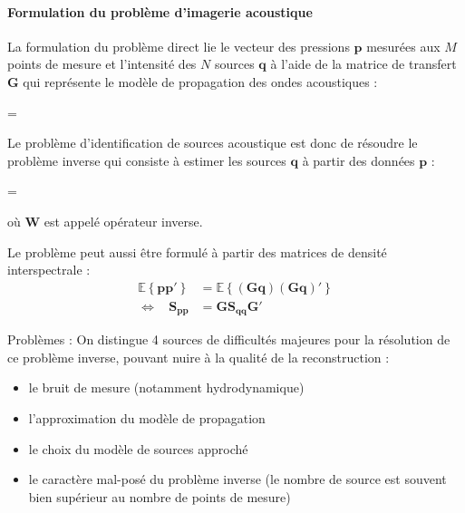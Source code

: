 \documentclass[twocolumn, 11pt, landscape]{article}
\renewenvironment{equation}{\vspace{-0.2cm}\begin{oldequation}}{\vspace{-0.2cm}\end{oldequation}}
\begin{document}
\paragraph{Formulation du problème d'imagerie acoustique}
La formulation du problème direct lie le vecteur des pressions $\bm{p}$ mesurées aux $M$ points de mesure et l'intensité des $N$ sources $\bm{q}$ à l'aide de la matrice de transfert $\bm{G}$ qui représente le modèle de propagation des ondes acoustiques : 
\begin{equation}
=
\end{equation}

Le problème d'identification de sources acoustique est donc de résoudre le problème inverse qui consiste à estimer les sources $\bm{q}$ à partir des données  $\bm{p}$ :
\begin{equation}
=
\end{equation}
où $\bm{W}$ est appelé opérateur inverse.

Le problème peut aussi être formulé à partir des matrices de densité interspectrale  : 
\begin{align}
		 \mathbb{E} \left\{ \bm{p p}' \right\} &= \mathbb{E} \left\{ (\bm{Gq})(\bm{Gq})' \right\}\\
	\Leftrightarrow~~~~  \bm{S_{pp}} &= \bm{G S_{qq}G}'
\end{align} 




Problèmes : On distingue 4 sources de difficultés majeures pour la résolution de ce problème inverse, pouvant nuire à la qualité de la reconstruction : \\
\begin{itemize}
	\item le bruit de mesure (notamment hydrodynamique)
	\item l'approximation du modèle de propagation
	\item le choix du modèle de sources approché
	\item le caractère mal-posé du problème inverse (le nombre de source est souvent bien supérieur au nombre de points de mesure)
\end{itemize}

\end{document}

